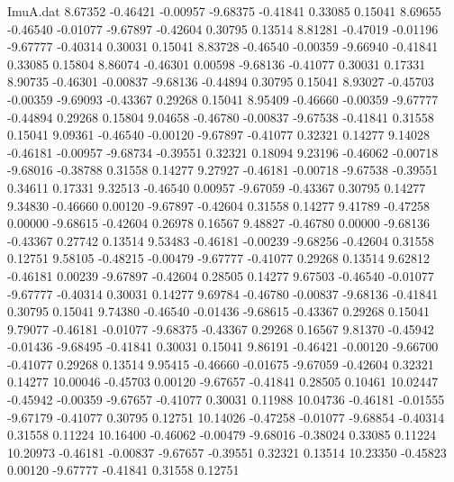 \begin{filecontents}{ImuA.dat}
   8.67352   -0.46421   -0.00957   -9.68375   -0.41841    0.33085    0.15041
   8.69655   -0.46540   -0.01077   -9.67897   -0.42604    0.30795    0.13514
   8.81281   -0.47019   -0.01196   -9.67777   -0.40314    0.30031    0.15041
   8.83728   -0.46540   -0.00359   -9.66940   -0.41841    0.33085    0.15804
   8.86074   -0.46301    0.00598   -9.68136   -0.41077    0.30031    0.17331
   8.90735   -0.46301   -0.00837   -9.68136   -0.44894    0.30795    0.15041
   8.93027   -0.45703   -0.00359   -9.69093   -0.43367    0.29268    0.15041
   8.95409   -0.46660   -0.00359   -9.67777   -0.44894    0.29268    0.15804
   9.04658   -0.46780   -0.00837   -9.67538   -0.41841    0.31558    0.15041
   9.09361   -0.46540   -0.00120   -9.67897   -0.41077    0.32321    0.14277
   9.14028   -0.46181   -0.00957   -9.68734   -0.39551    0.32321    0.18094
   9.23196   -0.46062   -0.00718   -9.68016   -0.38788    0.31558    0.14277
   9.27927   -0.46181   -0.00718   -9.67538   -0.39551    0.34611    0.17331
   9.32513   -0.46540    0.00957   -9.67059   -0.43367    0.30795    0.14277
   9.34830   -0.46660    0.00120   -9.67897   -0.42604    0.31558    0.14277
   9.41789   -0.47258    0.00000   -9.68615   -0.42604    0.26978    0.16567
   9.48827   -0.46780    0.00000   -9.68136   -0.43367    0.27742    0.13514
   9.53483   -0.46181   -0.00239   -9.68256   -0.42604    0.31558    0.12751
   9.58105   -0.48215   -0.00479   -9.67777   -0.41077    0.29268    0.13514
   9.62812   -0.46181    0.00239   -9.67897   -0.42604    0.28505    0.14277
   9.67503   -0.46540   -0.01077   -9.67777   -0.40314    0.30031    0.14277
   9.69784   -0.46780   -0.00837   -9.68136   -0.41841    0.30795    0.15041
   9.74380   -0.46540   -0.01436   -9.68615   -0.43367    0.29268    0.15041
   9.79077   -0.46181   -0.01077   -9.68375   -0.43367    0.29268    0.16567
   9.81370   -0.45942   -0.01436   -9.68495   -0.41841    0.30031    0.15041
   9.86191   -0.46421   -0.00120   -9.66700   -0.41077    0.29268    0.13514
   9.95415   -0.46660   -0.01675   -9.67059   -0.42604    0.32321    0.14277
  10.00046   -0.45703    0.00120   -9.67657   -0.41841    0.28505    0.10461
  10.02447   -0.45942   -0.00359   -9.67657   -0.41077    0.30031    0.11988
  10.04736   -0.46181   -0.01555   -9.67179   -0.41077    0.30795    0.12751
  10.14026   -0.47258   -0.01077   -9.68854   -0.40314    0.31558    0.11224
  10.16400   -0.46062   -0.00479   -9.68016   -0.38024    0.33085    0.11224
  10.20973   -0.46181   -0.00837   -9.67657   -0.39551    0.32321    0.13514
  10.23350   -0.45823    0.00120   -9.67777   -0.41841    0.31558    0.12751

\end{filecontents}
